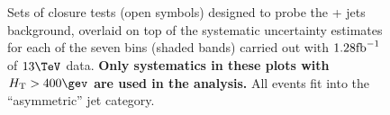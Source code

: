 \clearpage
\begin{figure}[h!]
  \begin{center}
     ~~
     \\
     ~~
     \\
    \caption{Sets of closure tests (open symbols) designed to probe
      the \znunu + jets background, overlaid on top of
      the systematic uncertainty estimates for each of the seven
      \scalht bins (shaded bands) carried out with $1.28\text{fb}^{-1}$ of
      $13\tev$ data. {\bf Only systematics in these plots with
      $\scalht>400\gev$ are used in the analysis.} All events fit 
      into the ``asymmetric'' jet
      category.}
    \label{fig:ZinvclosureDataAsymgt400}
  \end{center} 
\end{figure}

